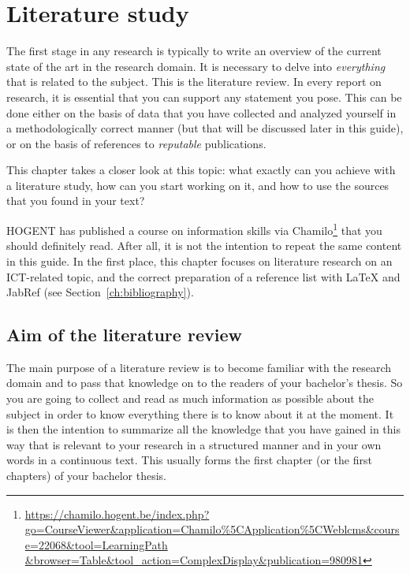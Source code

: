 \chapter{Literature study}
\label{ch:literaturestudy}

The first stage in any research is typically to write an overview of the current state of the art in the research domain. It is necessary to delve into \emph{everything} that is related to the subject. This is the literature review. In every report on research, it is essential that you can support any statement you pose. This can be done either on the basis of data that you have collected and analyzed yourself in a methodologically correct manner (but that will be discussed later in this guide), or on the basis of references to \emph{reputable} publications.

This chapter takes a closer look at this topic: what exactly can you achieve with a literature study, how can you start working on it, and how to use the sources that you found in your text?

HOGENT has published a course on information skills via Chamilo\footnote{\url{https://chamilo.hogent.be/index.php?go=CourseViewer\&application=Chamilo\%5CApplication\%5CWeblcms\&course=22068\&tool=LearningPath \&browser=Table\&tool_action=ComplexDisplay\&publication=980981}} that you should definitely read. After all, it is not the intention to repeat the same content in this guide. In the first place, this chapter focuses on literature research on an ICT-related topic, and the correct preparation of a reference list with {\LaTeX} and JabRef (see Section~\ref{ch:bibliography}).

\section{Aim of the literature review}
\label{sec:aimliteraturereview}

The main purpose of a literature review is to become familiar with the research domain and to pass that knowledge on to the readers of your bachelor's thesis. So you are going to collect and read as much information as possible about the subject in order to know everything there is to know about it at the moment. It is then the intention to summarize all the knowledge that you have gained in this way that is relevant to your research in a structured manner and in your own words in a continuous text. This usually forms the first chapter (or the first chapters) of your bachelor thesis.

